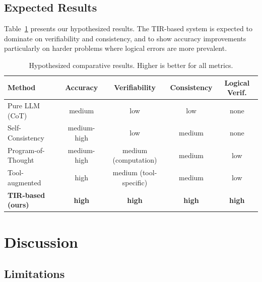 \documentclass[11pt,a4paper]{article}
\begin{document}
\subsection{Expected Results}

Table~\ref{tab:expected} presents our hypothesized results. The TIR-based system is expected to dominate on verifiability and consistency, and to show accuracy improvements particularly on harder problems where logical errors are more prevalent.

\begin{table}[h]
\centering
\caption{Hypothesized comparative results. Higher is better for all metrics.}
\label{tab:expected}
\small
\begin{tabular}{lcccc}
\toprule
\textbf{Method} & \textbf{Accuracy} & \textbf{Verifiability} & \textbf{Consistency} & \textbf{Logical Verif.} \\
\midrule
Pure LLM (CoT) & medium & low & low & none \\
Self-Consistency & medium-high & low & medium & none \\
Program-of-Thought & medium-high & medium (computation) & medium & low \\
Tool-augmented & high & medium (tool-specific) & medium & low \\
\textbf{TIR-based (ours)} & \textbf{high} & \textbf{high} & \textbf{high} & \textbf{high} \\
\bottomrule
\end{tabular}
\end{table}

\section{Discussion}
\label{sec:discussion}

\subsection{Limitations}
\end{document}

